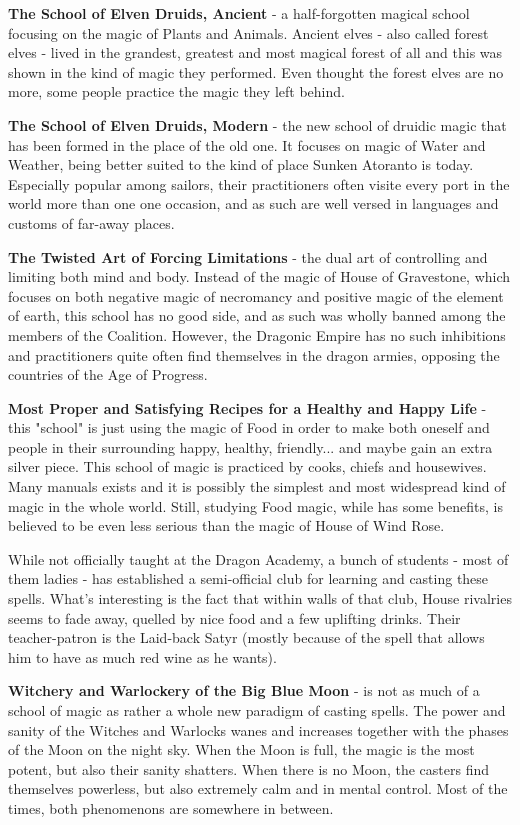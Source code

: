 \documentclass[a4paper,11pt]{article}
\begin{document}
\textbf{The School of Elven Druids, Ancient} - a half-forgotten magical school focusing on the magic of Plants and Animals. Ancient elves - also called forest elves - lived in the grandest, greatest and most magical forest of all and this was shown in the kind of magic they performed. Even thought the forest elves are no more, some people practice the magic they left behind. 

\textbf{The School of Elven Druids, Modern} - the new school of druidic magic that has been formed in the place of the old one. It focuses on magic of Water and Weather, being better suited to the kind of place Sunken Atoranto is today. Especially popular among sailors, their practitioners often visite every port in the world more than one one occasion, and as such are well versed in languages and customs of far-away places. 

\textbf{The Twisted Art of Forcing Limitations} - the dual art of controlling and limiting both mind and body. Instead of the magic of House of Gravestone, which focuses on both negative magic of necromancy and positive magic of the element of earth, this school has no good side, and as such was wholly banned among the members of the Coalition. However, the Dragonic Empire has no such inhibitions and practitioners quite often find themselves in the dragon armies, opposing the countries of the Age of Progress. 

\textbf{Most Proper and Satisfying Recipes for a Healthy and Happy Life} - this "school" is just using the magic of Food in order to make both oneself and people in their surrounding happy, healthy, friendly... and maybe gain an extra silver piece. This school of magic is practiced by cooks, chiefs and housewives. Many manuals exists and it is possibly the simplest and most widespread kind of magic in the whole world. Still, studying Food magic, while has some benefits, is believed to be even less serious than the magic of House of Wind Rose. 

While not officially taught at the Dragon Academy, a bunch of students - most of them ladies - has established a semi-official club for learning and casting these spells. What's interesting is the fact that within walls of that club, House rivalries seems to fade away, quelled by nice food and a few uplifting drinks. Their teacher-patron is the Laid-back Satyr (mostly because of the spell that allows him to have as much red wine as he wants). 

\textbf{Witchery and Warlockery of the Big Blue Moon} - is not as much of a school of magic as rather a whole new paradigm of casting spells. The power and sanity of the Witches and Warlocks wanes and increases together with the phases of the Moon on the night sky. When the Moon is full, the magic is the most potent, but also their sanity shatters. When there is no Moon, the casters find themselves powerless, but also extremely calm and in mental control. Most of the times, both phenomenons are somewhere in between.
\end{document}

